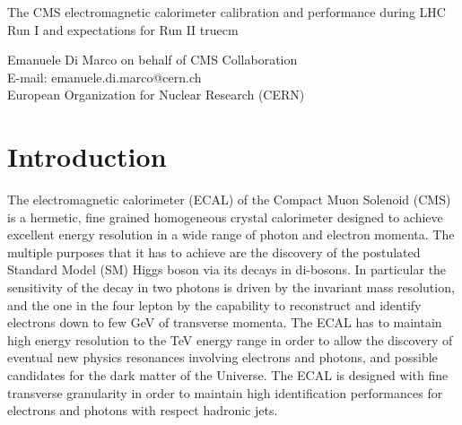 \documentclass[11pt,twocolumn]{article}
\begin{document}
The CMS electromagnetic calorimeter calibration and
  performance during LHC Run I and expectations for Run II
 truecm

\centerline{Emanuele Di Marco on behalf of CMS Collaboration \\
E-mail: emanuele.di.marco@cern.ch \\
European Organization for Nuclear Research (CERN) \\
}


\section{Introduction}

The electromagnetic calorimeter (ECAL) of the Compact Muon Solenoid
(CMS) is a hermetic, fine grained homogeneous crystal calorimeter
designed to achieve excellent energy resolution in a wide range of
photon and electron momenta. The multiple purposes that it has to
achieve are the discovery of the postulated Standard Model (SM) Higgs
boson via its decays in di-bosons. In particular the sensitivity of
the decay in two photons is driven by the invariant mass resolution,
and the one in the four lepton by the capability to reconstruct and
identify electrons down to few GeV of transverse momenta.  The ECAL
has to maintain high energy resolution to the TeV energy range in
order to allow the discovery of eventual new physics resonances
involving electrons and photons, and possible candidates for the dark
matter of the Universe.  The ECAL is designed with fine transverse
granularity in order to maintain high identification performances for
electrons and photons with respect hadronic jets.
\end{document}
